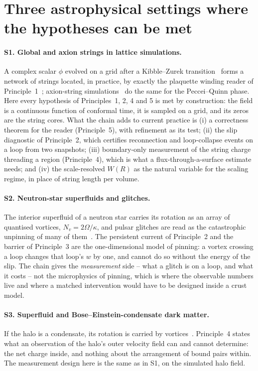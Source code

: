 \documentclass[11pt,a4paper]{article}
\begin{document}
\section{Three astrophysical settings where the hypotheses can be met}\label{sec:settings}

\paragraph{S1. Global and axion strings in lattice simulations.} A complex scalar $\phi$ evolved on a
grid after a Kibble--Zurek transition~\cite{Kibble1976} forms a network of strings located, in
practice, by exactly the plaquette winding reader of Principle~1~\cite{VachaspatiVilenkin1984,
HindmarshKibble1995}; axion-string simulations~\cite{Gorghetto2018} do the same for the
Peccei--Quinn phase. Here every hypothesis of Principles~1, 2, 4 and 5 is met by construction: the
field is a continuous function of conformal time, it is sampled on a grid, and its zeros are the
string cores. What the chain adds to current practice is (i) a correctness theorem for the reader
(Principle~5), with refinement as its test; (ii) the slip diagnostic of Principle~2, which certifies
reconnection and loop-collapse events on a loop from two snapshots; (iii) boundary-only measurement
of the string charge threading a region (Principle~4), which is what a flux-through-a-surface
estimate needs; and (iv) the scale-resolved $W(R)$ as the natural variable for the scaling regime,
in place of string length per volume.

\paragraph{S2. Neutron-star superfluids and glitches.} The interior superfluid of a neutron star
carries its rotation as an array of quantised vortices, $N_v=2\Omega/\kappa$, and pulsar glitches
are read as the catastrophic unpinning of many of them~\cite{AndersonItoh1975}. The persistent
current of Principle~2 and the barrier of Principle~3 are the one-dimensional model of pinning: a
vortex crossing a loop changes that loop's $w$ by one, and cannot do so without the energy of the
slip. The chain gives the \emph{measurement} side -- what a glitch is on a loop, and what it costs
-- not the microphysics of pinning, which is where the observable numbers live and where a matched
intervention would have to be designed inside a crust model.

\paragraph{S3. Superfluid and Bose--Einstein-condensate dark matter.} If the halo is a condensate,
its rotation is carried by vortices~\cite{RindlerDallerShapiro2012}. Principle~4 states what an
observation of the halo's outer velocity field can and cannot determine: the net charge inside, and
nothing about the arrangement of bound pairs within. The measurement design here is the same as in
S1, on the simulated halo field.
\end{document}
